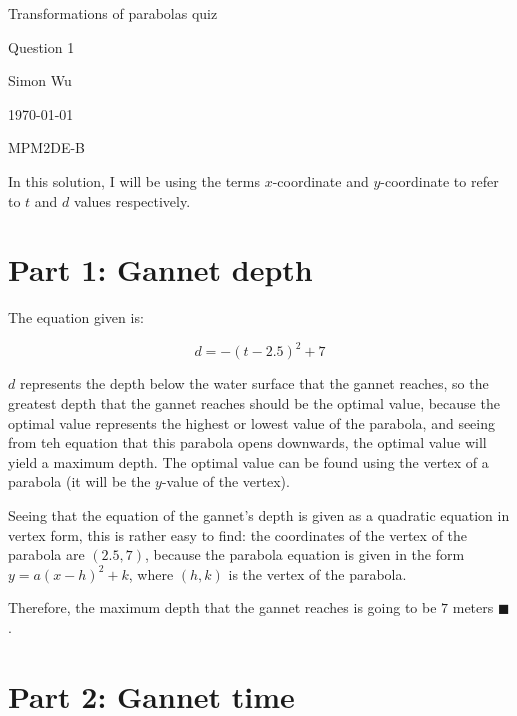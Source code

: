\documentclass[12pt]{article}
\begin{document}
\begin{titlepage}

\begin{center}
    \Huge{Transformations of parabolas quiz}
    
    \vspace{0.5in}
    
    \Large{Question 1}
    
    \vspace{0.5in}
    
    \Large{Simon Wu}
    
    \Large{\today}
    
    \vspace{1in}
    
    \Large{MPM2DE-B}

    
\end{center}

\tableofcontents

\end{titlepage}

In this solution, I will be using the terms $x$-coordinate and $y$-coordinate to refer to $t$ and $d$ values respectively.

\section{Part 1: Gannet depth}

The equation given is:

\[
d = -(t - 2.5)^2 + 7
\]

$d$ represents the depth below the water surface that the gannet reaches, so the greatest depth that the gannet reaches should be the optimal value, because the optimal value represents the highest or lowest value of the parabola, and seeing from teh equation that this parabola opens downwards, the optimal value will yield a maximum depth.
The optimal value can be found using the vertex of a parabola (it will be the $y$-value of the vertex).

Seeing that the equation of the gannet's depth is given as a quadratic equation in vertex form, this is rather easy to find: the coordinates of the vertex of the parabola are $(2.5, 7)$, because the parabola equation is given in the form $y = a(x-h)^2 + k$, where $(h, k)$ is the vertex of the parabola.

Therefore, the maximum depth that the gannet reaches is going to be $7$ meters $\blacksquare$.

\section{Part 2: Gannet time}
\end{document}
